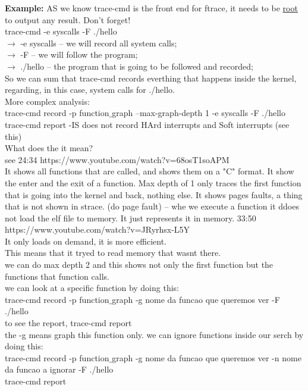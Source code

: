 \documentclass[11pt, a4paper, oneside]{article}
\theoremstyle{definition}
\begin{document}
\textbf{Example:}
AS we know trace-cmd is the front end for ftrace, it needs to be \uline{root} to output any result. Don't forget!\\
\indent trace-cmd -e syscalls -F ./hello\\
$\rightarrow$ -e syscalls -- we will record all system calls;\\
$\rightarrow$ -F -- we will follow the program;\\
$\rightarrow$ ./hello -- the program that is going to be followed and recorded;\\
So we can sum that trace-cmd records everthing that happens inside the kernel, regarding, in this case, system calls for ./hello.\\


More complex analysis:\\

trace-cmd record -p function$\_$graph --max-graph-depth 1 -e syscalls -F ./hello \\
trace-cmd report -IS does not record HArd interrupts and Soft interrupts (see this)\\

What does the it mean?\\
see 24:34 https://www.youtube.com/watch?v=68osT1soAPM\\
It shows all functions that are called, and shows them on a "C" format. It show the enter and the exit of a function. Max depth of 1 only traces the first function that is going into the kernel and back, nothing else. It shows pages faults, a thing that is not shown in strace. (do page fault) -- whe we execute a function it ddoes not load the elf file to memory. It just represents it in memory. 33:50 https://www.youtube.com/watch?v=JRyrhsx-L5Y\\
It only loads on demand, it is more efficient.\\
This means that it tryed to read memory that wasnt there.\\
we can do max depth 2 and this shows not only the first function but the functions that function calls.\\
we can look at a specific function by doing this:\\
trace-cmd record -p function$\_$graph -g nome da funcao que queremos ver -F ./hello\\
to see the report, trace-cmd report\\
the -g means graph this function only. 
we can ignore functions inside our serch by doing this:\\
trace-cmd record -p function$\_$graph -g nome da funcao que queremos ver -n nome da funcao a ignorar -F ./hello\\
trace-cmd report\\
\end{document}
